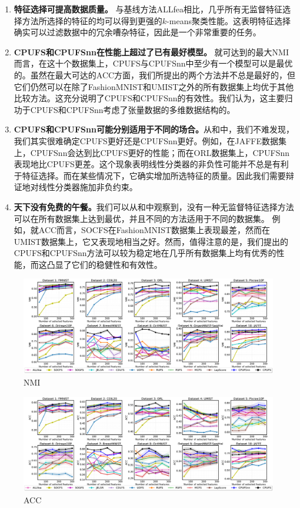 \begin{enumerate}
    \item \textbf{特征选择可提高数据质量。}
    与基线方法ALLfea相比，几乎所有无监督特征选择方法所选择的特征的均可以得到更强的$k$-means聚类性能。这表明特征选择确实可以过滤数据中的冗余嘈杂特征，因此是一个非常重要的任务。
    \item \textbf{CPUFS和CPUFSnn在性能上超过了已有最好模型。}
    就可达到的最大NMI而言，在这十个数据集上，CPUFS与CPUFSnn中至少有一个模型可以是最优的。虽然在最大可达的ACC方面，我们所提出的两个方法并不总是最好的，但它们仍然可以在除了FashionMNIST和UMIST之外的所有数据集上均优于其他比较方法。这充分说明了CPUFS和CPUFSnn的有效性。我们认为，这主要归功于CPUFS和CPUFSnn考虑了张量数据的多维数据结构的。
    \item \textbf{CPUFS和CPUFSnn可能分别适用于不同的场合。}从和中，我们不难发现，我们其实很难确定CPUFS更好还是CPUFSnn更好。例如，在JAFFE数据集上，CPUFSnn会达到比CPUFS更好的性能；而在ORL数据集上，CPUFSnn表现地比CPUFS更差。这个现象表明线性分类器的非负性可能并不总是有利于特征选择。而在某些情况下，它确实增加所选特征的质量。因此我们需要辩证地对线性分类器施加非负约束。
    \item \textbf{天下没有免费的午餐。}我们可以从和中观察到，没有一种无监督特征选择方法可以在所有数据集上达到最优，并且不同的方法适用于不同的数据集。 例如，就ACC而言，SOCFS在FashionMNIST数据集上表现最差，然而在UMIST数据集上，它又表现地相当之好。然而，值得注意的是，我们提出的CPUFS和CPUFSnn方法可以较为稳定地在几乎所有数据集上均有优秀的性能，而这凸显了它们的稳健性和有效性。
\end{enumerate}

\begin{figure}
    \centering
    \includegraphics[width=\linewidth]{figures/CPUFS/NMIACC/PAMI_NMI.pdf}
    \caption{NMI}
    \label{fig:cpufs-nmi}
\end{figure}

\begin{figure}
    \centering
    \includegraphics[width=\linewidth]{figures/CPUFS/NMIACC/PAMI_ACC.pdf}
    \caption{ACC}
    \label{fig:cpufs-acc}
\end{figure}

